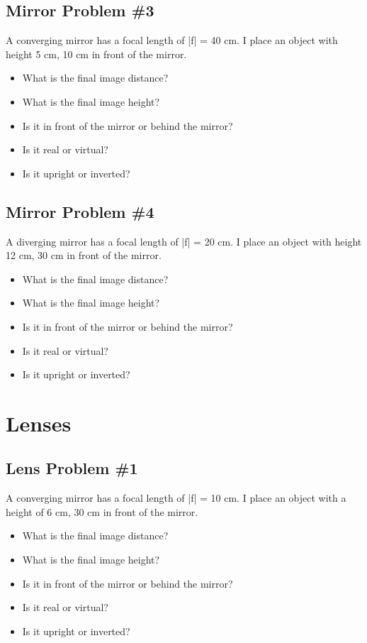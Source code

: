 \documentclass[11pt]{article}
\begin{document}
\subsection{Mirror Problem \#3}
A converging mirror has a focal length of |f| = 40 cm.  I place an object with height 5 cm, 10 cm in front of the mirror.  

\begin{itemize}
\item What is the final image distance?
\item What is the final image height?
\item Is it in front of the mirror or behind the mirror?  
\item Is it real or virtual?
\item Is it upright or inverted?
\end{itemize}

\subsection{Mirror Problem \#4}
A diverging mirror has a focal length of |f| = 20 cm.  I place an object with height 12 cm, 30 cm in front of the mirror.  

\begin{itemize}
\item What is the final image distance?
\item What is the final image height?
\item Is it in front of the mirror or behind the mirror?  
\item Is it real or virtual?
\item Is it upright or inverted?
\end{itemize}

\pagebreak
\section{Lenses}

\subsection{Lens Problem \#1}
A converging mirror has a focal length of |f| = 10 cm.  I place an object with a height of 6 cm, 30 cm in front of the mirror.  

\begin{itemize}
\item What is the final image distance?
\item What is the final image height?
\item Is it in front of the mirror or behind the mirror?  
\item Is it real or virtual?
\item Is it upright or inverted?
\end{itemize}
\end{document}
